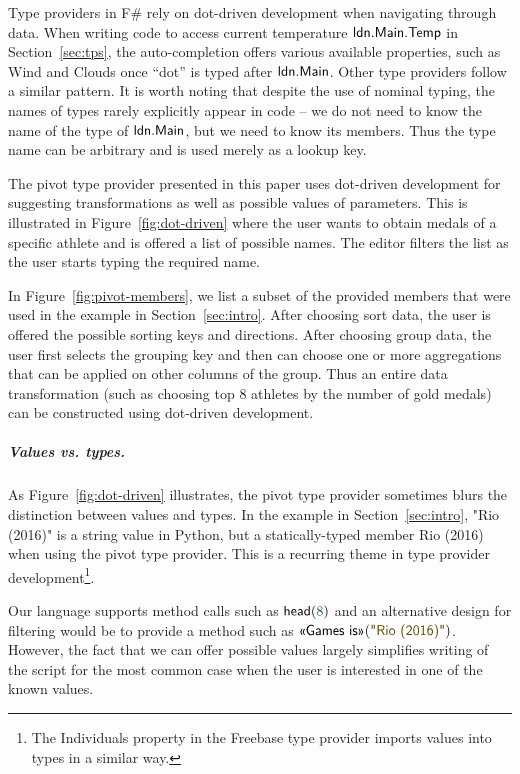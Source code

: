 \documentclass[a4paper,UKenglish]{lipics-v2016}
\theoremstyle{plain}
\theoremstyle{definition}
\newcommand{\num}[1]{\textcolor{numclr}{#1}}
\newcommand{\str}[1]{\textnormal{\textcolor{strclr}{\sffamily "#1"}}}
\newcommand{\ident}[1]{\textnormal{\sffamily #1}}
\newcommand{\qident}[1]{\textnormal{\sffamily \guillemotleft #1\guillemotright}}
\begin{document}
Type providers in F\# rely on dot-driven development when navigating through data. When writing code 
to access current temperature $\ident{ldn.Main.Temp}$ in Section~\ref{sec:tps}, the auto-completion
offers various available properties, such as \ident{Wind} and \ident{Clouds} once ``dot'' is typed
after $\ident{ldn.Main}$. Other type providers \cite{inforich} follow a similar pattern. It is worth noting
that despite the use of nominal typing, the names of types rarely explicitly appear in code -- we
do not need to know the name of the type of $\ident{ldn.Main}$, but we need to know its members.
Thus the type name can be arbitrary \cite{fsdata} and is used merely as a lookup key.

The pivot type provider presented in this paper uses dot-driven development for suggesting 
transformations as well as possible values of parameters. This is illustrated in Figure~\ref{fig:dot-driven}
where the user wants to obtain medals of a specific athlete and is offered a list of possible 
names. The editor filters the list as the user starts typing the required name. 

In Figure~\ref{fig:pivot-members}, we list a subset of the provided members that were used in the
example in Section~\ref{sec:intro}. After choosing \qident{sort data}, the user is offered 
the possible sorting keys and directions. After choosing \qident{group data}, the user first 
selects the grouping key and then can choose one or more aggregations that can be applied on
other columns of the group. Thus an entire data transformation (such as choosing top 8 athletes
by the number of gold medals) can be constructed using dot-driven development.
  
\subparagraph{Values vs. types.}
As Figure~\ref{fig:dot-driven} illustrates, the pivot type provider sometimes blurs the 
distinction between values and types. In the example in Section~\ref{sec:intro},
\str{Rio (2016)} is a string value in Python, but a statically-typed member \qident{Rio (2016)}
when using the pivot type provider. This is a recurring theme in type provider development\footnote{The
\ident{Individuals} property in the Freebase type provider \cite{inforich} imports values into types in a similar way.}.

Our language supports method calls such as $\ident{head}(\num{8})$ and an alternative design for
filtering would be to provide a method such as $\qident{Games is}(\str{Rio (2016)})$. However,
the fact that we can offer possible values largely simplifies writing of the script for the most 
common case when the user is interested in one of the known values.
\end{document}
